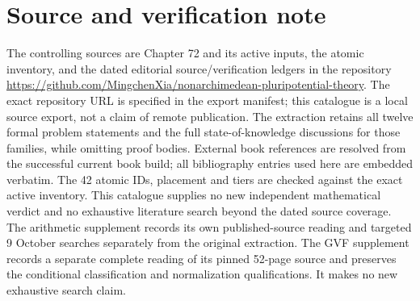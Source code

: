 \documentclass[11pt,a4paper]{article}
\theoremstyle{definition}
\theoremstyle{remark}
\begin{document}
\section*{Source and verification note}
The controlling sources are Chapter 72 and its active inputs, the atomic
inventory, and the dated editorial source/verification ledgers in the
repository \url{https://github.com/MingchenXia/nonarchimedean-pluripotential-theory}.
The exact repository URL is specified in the export manifest; this catalogue
is a local source export, not a claim of remote publication.
The extraction retains all twelve formal problem statements and the full
state-of-knowledge discussions for those families, while omitting proof
bodies. External book references are resolved from the successful current
book build; all bibliography entries used here are embedded verbatim.
The 42 atomic IDs, placement and tiers are checked against the exact active
inventory. This catalogue supplies no new independent mathematical verdict
and no exhaustive literature search beyond the dated source coverage.
The arithmetic supplement records its own published-source reading and
targeted 9 October searches separately from the original extraction.
The GVF supplement records a separate complete reading of its pinned
52-page source and preserves the conditional classification and
normalization qualifications. It makes no new exhaustive search claim.
\end{document}
